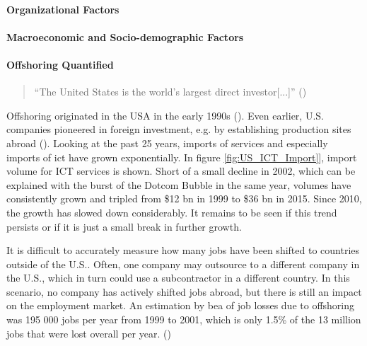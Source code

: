 \paragraph{Organizational Factors}

\paragraph{Macroeconomic and Socio-demographic Factors}

\paragraph{Offshoring Quantified}
\begin{quote}
	``The United States is the world's largest direct investor[...]'' \linebreak(\cite[p. 3]{Kozlow.2006})
\end{quote}

Offshoring originated in the USA in the early 1990s (\cite[p. 389]{Pisani.2016}). Even earlier, U.S. companies pioneered in foreign investment, e.g. by establishing production sites abroad (\cite[p. 5]{Kozlow.2006}). Looking at the past 25 years, imports of services and especially imports of \gls{ict} have grown exponentially. In figure \ref{fig:US_ICT_Import}], import volume for ICT services is shown. Short of a small decline in 2002, which can be explained with the burst of the Dotcom Bubble in the same year, volumes have consistently grown and tripled from \$12 bn in 1999 to \$36 bn in 2015. Since 2010, the growth has slowed down considerably. It remains to be seen if this trend persists or if it is just a small break in further growth.


It is difficult to accurately measure how many jobs have been shifted to countries outside of the U.S.. Often, one company may outsource to a different company in the U.S., which in turn could use a subcontractor in a different country. In this scenario, no company has actively shifted jobs abroad, but there is still an impact on the employment market. An estimation by \gls{bea} of job losses due to offshoring was 195 000 jobs per year from 1999 to 2001, which is only 1.5\% of the 13 million jobs that were lost overall per year. (\cite[pp. 14ff]{Kozlow.2006})


